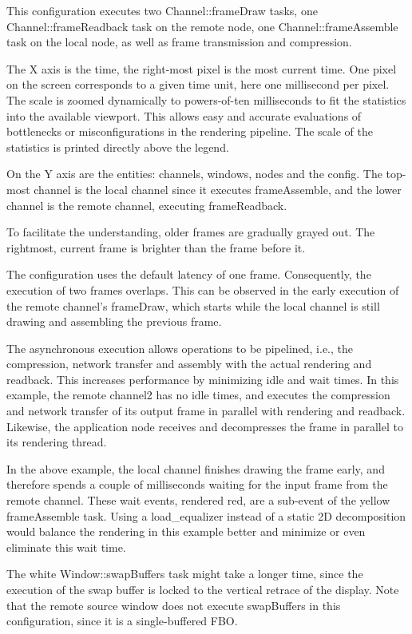 \documentclass[10pt,a4]{scrartcl}
\begin{document}
This configuration executes two \textsf{Channel::frameDraw} tasks, one
\textsf{Channel::frame\-Read\-back} task on the remote node, one
\textsf{Channel::frameAssemble} task on the local node, as well as frame
transmission and compression.

The X axis is the time, the right-most pixel is the most current time. One
pixel on the screen corresponds to a given time unit, here one millisecond per
pixel. The scale is zoomed dynamically to powers-of-ten milliseconds to fit the
statistics into the available viewport. This allows easy and accurate
evaluations of bottlenecks or misconfigurations in the rendering pipeline. The
scale of the statistics is printed directly above the legend.

On the Y axis are the entities: channels, windows, nodes and the config. The
top-most channel is the local channel since it executes \textsf{frameAssemble},
and the lower channel is the remote channel, executing \textsf{frameReadback}.

To facilitate the understanding, older frames are gradually grayed out. The
rightmost, current frame is brighter than the frame before it.

The configuration uses the default latency of one frame. Consequently, the
execution of two frames overlaps. This can be observed in the early execution of
the remote channel's \textsf{frameDraw}, which starts while the local channel is
still drawing and assembling the previous frame. 

The asynchronous execution allows operations to be pipelined, i.e., the
compression, network transfer and assembly with the actual rendering and
readback. This increases performance by minimizing idle and wait times. In this
example, the remote \textsf{channel2} has no idle times, and executes the
compression and network transfer of its output frame in parallel with rendering
and readback. Likewise, the application node receives and decompresses the frame
in parallel to its rendering thread.

In the above example, the local channel finishes drawing the frame early, and
therefore spends a couple of milliseconds waiting for the input frame from the
remote channel. These wait events, rendered red, are a sub-event of the yellow
\textsf{frameAssemble} task. Using a \textsf{load\_equalizer} instead of a
static 2D decomposition would balance the rendering in this example better and
minimize or even eliminate this wait time.

The white \textsf{Window::swapBuffers} task might take a longer time, since the
execution of the swap buffer is locked to the vertical retrace of the
display. Note that the remote source window does not execute swapBuffers in
this configuration, since it is a single-buffered FBO.
\end{document}
